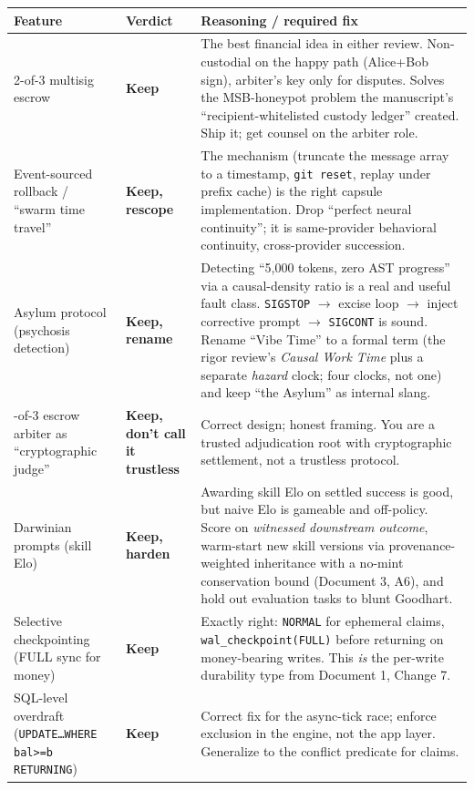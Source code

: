 \documentclass[11pt,a4paper]{article}
\begin{document}
\begin{longtable}{@{}p{}p{}p{}@{}}
\toprule
\textbf{Feature} & \textbf{Verdict} & \textbf{Reasoning / required fix} \\
\midrule
\endhead
2-of-3 multisig escrow & \textbf{Keep} & The best financial idea in either review. Non-custodial on the happy path (Alice+Bob sign), arbiter's key only for disputes. Solves the MSB-honeypot problem the manuscript's ``recipient-whitelisted custody ledger'' created. Ship it; get counsel on the arbiter role. \\
\addlinespace
Event-sourced rollback / ``swarm time travel'' & \textbf{Keep, rescope} & The mechanism (truncate the message array to a timestamp, \texttt{git reset}, replay under prefix cache) is the right capsule implementation. Drop ``perfect neural continuity''; it is same-provider behavioral continuity, cross-provider succession. \\
\addlinespace
Asylum protocol (psychosis detection) & \textbf{Keep, rename} & Detecting ``5{,}000 tokens, zero AST progress'' via a causal-density ratio is a real and useful fault class. \texttt{SIGSTOP} $\to$ excise loop $\to$ inject corrective prompt $\to$ \texttt{SIGCONT} is sound. Rename ``Vibe Time'' to a formal term (the rigor review's \emph{Causal Work Time} plus a separate \emph{hazard} clock; four clocks, not one) and keep ``the Asylum'' as internal slang. \\
\addlinespace
2-of-3 escrow arbiter as ``cryptographic judge'' & \textbf{Keep, don't call it trustless} & Correct design; honest framing. You are a trusted adjudication root with cryptographic settlement, not a trustless protocol. \\
\addlinespace
Darwinian prompts (skill Elo) & \textbf{Keep, harden} & Awarding skill Elo on settled success is good, but naive Elo is gameable and off-policy. Score on \emph{witnessed downstream outcome}, warm-start new skill versions via provenance-weighted inheritance with a no-mint conservation bound (Document 3, A6), and hold out evaluation tasks to blunt Goodhart. \\
\addlinespace
Selective checkpointing (FULL sync for money) & \textbf{Keep} & Exactly right: \texttt{NORMAL} for ephemeral claims, \texttt{wal\_checkpoint(FULL)} before returning on money-bearing writes. This \emph{is} the per-write durability type from Document 1, Change 7. \\
\addlinespace
SQL-level overdraft (\texttt{UPDATE\ldots WHERE bal>=b RETURNING}) & \textbf{Keep} & Correct fix for the async-tick race; enforce exclusion in the engine, not the app layer. Generalize to the conflict predicate for claims. \\

\end{longtable}
\end{document}
